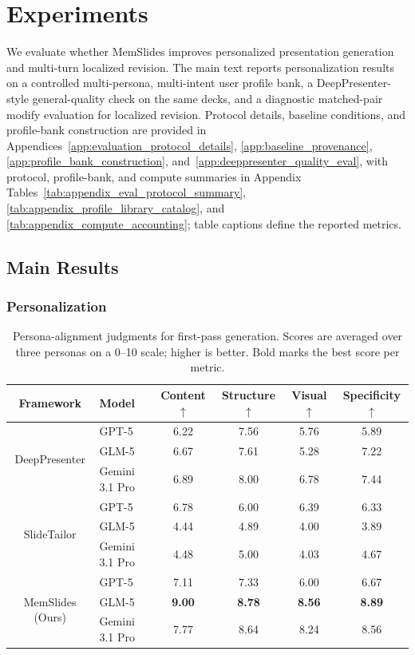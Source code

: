 \documentclass{llmxive}
\providecommand{\methodname}{MemSlides\xspace}
\providecommand{\arraystretch}{1.0}
\begin{document}
\section{Experiments}

\vspace{-1.2ex}
We evaluate whether \methodname improves personalized presentation generation
and multi-turn localized revision. The main text reports personalization results
on a controlled multi-persona, multi-intent user profile bank, a
DeepPresenter-style general-quality check on the same decks, and a diagnostic
matched-pair modify evaluation for localized revision. Protocol details,
baseline conditions, and profile-bank construction are provided in
Appendices~\ref{app:evaluation_protocol_details},
\ref{app:baseline_provenance}, \ref{app:profile_bank_construction},
and~\ref{app:deeppresenter_quality_eval}, with protocol, profile-bank, and
compute summaries in Appendix Tables~\ref{tab:appendix_eval_protocol_summary},
\ref{tab:appendix_profile_library_catalog}, and
\ref{tab:appendix_compute_accounting}; table captions define the reported
metrics.

\subsection{Main Results}

\subsubsection{Personalization}

\begin{table}[t]
\centering
\small
\setlength{\tabcolsep}{6pt}
\renewcommand{\arraystretch}{1.0}
\begin{tabular}{clcccc}
\toprule
Framework & Model & Content $\uparrow$ & Structure $\uparrow$ & Visual $\uparrow$ & Specificity $\uparrow$ \\
\midrule
\multirow{3}{*}{\centering DeepPresenter} & GPT-5 & 6.22 & 7.56 & 5.76 & 5.89 \\
& GLM-5 & 6.67 & 7.61 & 5.28 & 7.22 \\
& Gemini 3.1 Pro & 6.89 & 8.00 & 6.78 & 7.44 \\
\midrule
\multirow{3}{*}{\centering SlideTailor} & GPT-5 & 6.78 & 6.00 & 6.39 & 6.33 \\
& GLM-5 & 4.44 & 4.89 & 4.00 & 3.89 \\
& Gemini 3.1 Pro & 4.48 & 5.00 & 4.03 & 4.67 \\
\midrule
\multirow{3}{*}{\centering MemSlides (Ours)} & GPT-5 & 7.11 & 7.33 & 6.00 & 6.67 \\
& GLM-5 & \textbf{9.00} & \textbf{8.78} & \textbf{8.56} & \textbf{8.89} \\
& Gemini 3.1 Pro & 7.77 & 8.64 & 8.24 & 8.56 \\
\bottomrule
\end{tabular}
\caption{Persona-alignment judgments for first-pass generation. Scores are
averaged over three personas on a 0--10 scale; higher is better. Bold marks the
best score per metric.}
\label{tab:profile_memory_v6_bestof_main}
\end{table}
\end{document}
